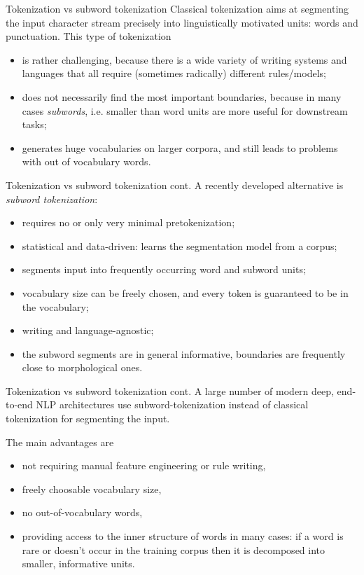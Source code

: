\documentclass[style=upen, size=14pt]{powerdot}
\theoremstyle{definition}
\begin{document}
\begin{slide}[toc=Subword tokenization]{Tokenization vs subword tokenization}
  Classical tokenization aims at segmenting the input character stream precisely
  into linguistically motivated units: words and punctuation. This type of
  tokenization

  \begin{itemize}
  \item is rather challenging, because there is a wide variety of writing systems
    and languages that all require (sometimes radically) different rules/models;
  \item does not necessarily find the most important boundaries, because in many
    cases \emph{subwords}, i.e. smaller than word units are more useful for
    downstream tasks;
  \item generates huge vocabularies on larger corpora, and still leads to
    problems with out of vocabulary words.
  \end{itemize}
\end{slide}

\begin{slide}[toc=]{Tokenization vs subword tokenization cont.}
  A recently developed alternative is \emph{subword tokenization}:
  \begin{itemize}
  \item requires no or only very minimal pretokenization;
  \item statistical and data-driven: learns the segmentation model from a corpus;
  \item segments input into frequently occurring word and subword units;
  \item vocabulary size can be freely chosen, and every token is guaranteed to
    be in the vocabulary;
  \item writing and language-agnostic;
  \item the subword segments are in general informative, boundaries are
    frequently close to morphological ones.
  \end{itemize}
\end{slide}

\begin{slide}[toc=]{Tokenization vs subword tokenization cont.}
  A large number of modern deep, end-to-end NLP architectures use
  subword-tokenization instead of classical tokenization for segmenting the
  input.\bigskip

  The main advantages are
  \begin{itemize}
  \item not requiring manual feature engineering or rule writing,
  \item freely choosable vocabulary size,
  \item no out-of-vocabulary words,
  \item providing access to the inner structure of words in many cases: if a
    word is rare or doesn't occur in the training corpus then it is decomposed
    into smaller, informative units.
  \end{itemize}
\end{slide}
\end{document}
